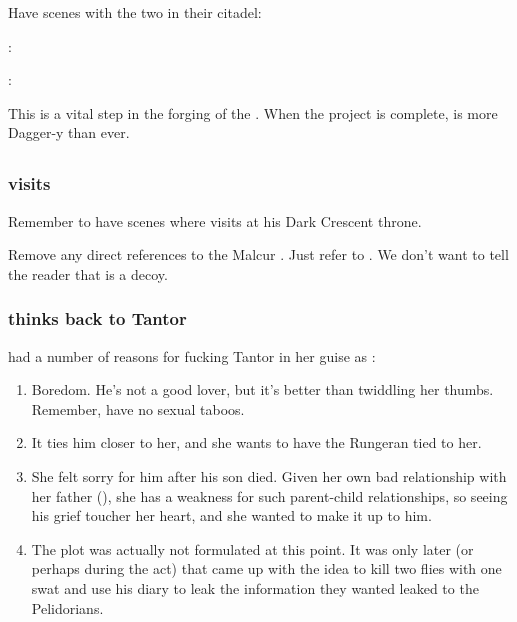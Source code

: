 \begin{garbage}
Have scenes with the two in their citadel:
\begin{prose}
  \Vizsherioch: 
  
  \Secherdamon: 
\end{prose}

This is a vital step in the forging of the . 
When the \Nithdornazsh{} project is complete, \Vizsherioch{} is more Dagger-y than ever. 








\subsection[Locar Psyrex]{\LocarPsyrex}
\subsubsection[Nzessuacrith visits Psyrex]{\Nzessuacrith{} visits \Psyrex}
Remember to have scenes where \Nzessuacrith{} visits \Psyrex{} at his Dark Crescent throne. 

Remove any direct references to the Malcur \nexus. 
Just refer to . 
We don't want to tell the reader that \Forklin{} is a decoy. 





\subsubsection{\Nzessuacrith{} thinks back to \Jirad{} Tantor}
\Nzessuacrith{} had a number of reasons for fucking \Jirad{} Tantor in her guise as \Takestsha: 

\begin{enumerate}
  \item 
    Boredom. 
    He's not a good lover, but it's better than twiddling her thumbs. 
    Remember, \dragons{} have no sexual taboos. 
  \item 
    It ties him closer to her, and she wants to have the Rungeran \ishrah{} tied to her. 
  \item
    She felt sorry for him after his son died. 
    Given her own bad relationship with her father (\Ishnaruchaefir), she has a weakness for such parent-child relationships, so seeing his grief toucher her heart, and she wanted to make it up to him. 
  \item
    The  plot was actually not formulated at this point. 
    It was only later (or perhaps during the act) that \Nzessuacrith{} came up with the idea to kill two flies with one swat and use his diary to leak the information they wanted leaked to the Pelidorians. 
\end{enumerate}






\end{garbage}
